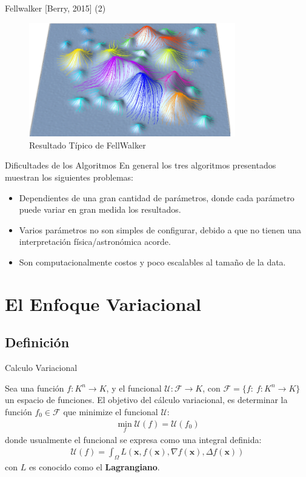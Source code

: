 \documentclass{beamer}
\begin{document}
\begin{frame}{Fellwalker [Berry, 2015] (2)}
\begin{figure}[htpb!]
\centering
\includegraphics[width=9cm]{fw2}
\caption{Resultado Típico de FellWalker}
\end{figure}
\end{frame}

\begin{frame}{Dificultades de los Algoritmos}
En general los tres algoritmos presentados muestran los siguientes problemas:
\begin{itemize}
  \item Dependientes de una gran cantidad de parámetros, donde cada parámetro puede variar en gran medida los resultados.
  \item Varios parámetros no son simples de configurar, debido a que no tienen una interpretación física/astronómica acorde.
  \item Son computacionalmente costos y poco escalables al tamaño de la data.
\end{itemize}
\end{frame}








\section{El Enfoque Variacional}

\subsection{Definición}

\begin{frame}{Calculo Variacional}
\begin{definition}
  Sea una función $f:K^n \rightarrow K$, y el funcional $\mathcal{U}:\mathcal{F}\rightarrow K$, con $\mathcal{F}= \{f: \ f:K^n \rightarrow K \}$ un espacio de funciones. El objetivo del cálculo variacional, es determinar la función $f_0 \in \mathcal{F}$ que minimize el funcional $\mathcal{U}$:
  \begin{align*}
    \min_{f} \mathcal{U}(f) = \mathcal{U}(f_0)
  \end{align*}
  donde usualmente el funcional se expresa como una integral definida:
  \begin{align*}
    \mathcal{U}(f) = \int_{\Omega} L\left( \mathbf{x}, f(\mathbf{x}), \nabla f(\mathbf{x}), \Delta f(\mathbf{x}) \right)
  \end{align*}
  con $L$ es conocido como el \textbf{Lagrangiano}.
\end{definition}
\end{frame}
\end{document}
